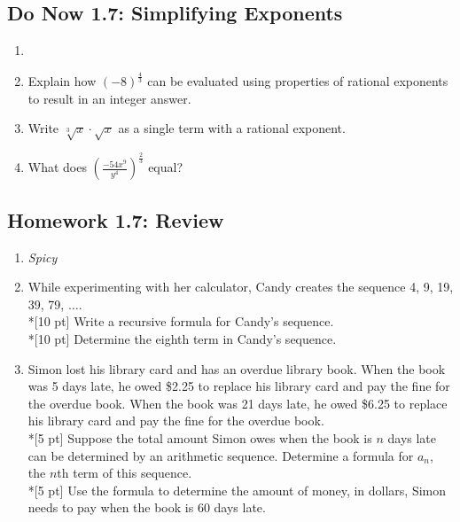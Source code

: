 \documentclass[12pt, oneside]{article}
\begin{document}
\newpage
\subsection*{Do Now 1.7: Simplifying Exponents}
\begin{enumerate}
  \item
  \item %
  Explain how $(-8)^\frac{4}{3}$ can be evaluated using properties of rational exponents to result in an integer answer.

  \item %
  Write $\sqrt[3]{x} \cdot \sqrt{x}$ as a single term with a rational exponent.

  \item %
  What does $\displaystyle \left( \frac{-54x^9}{y^4}\right)^{\frac{2}{3}}$ equal?

\end{enumerate}


\newpage
\subsection*{Homework 1.7: Review}
\begin{enumerate}
  \item
  \emph{Spicy}
  \item %
  While experimenting with her calculator, Candy creates the sequence 4, 9, 19, 39, 79, $\ldots$.\\*[10 pt]
  Write a recursive formula for Candy's sequence.\\*[10 pt]
  Determine the eighth term in Candy's sequence.

  \item %
  Simon lost his library card and has an overdue library book. When the book was 5 days late, he owed \$2.25 to replace his library card and pay the fine for the overdue book. When the book was 21 days late, he owed \$6.25 to replace his library card and pay the fine for the overdue book.\\*[5 pt]
  Suppose the total amount Simon owes when the book is $n$ days late can be determined by an arithmetic sequence. Determine a formula for $a_n$, the $n$th term of this sequence.\\*[5 pt]
  Use the formula to determine the amount of money, in dollars, Simon needs to pay when the book is 60 days late.


\end{enumerate}
\end{document}
